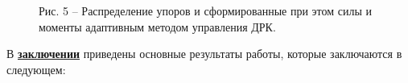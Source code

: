 \begin{figure}[ht]
    \caption*{Рис. 5 -- Распределение упоров и сформированные при этом силы и моменты адаптивным методом управления ДРК.}\label{fig:latex}
\end{figure}

\FloatBarrier
{}                                  %
В \underline{\textbf{заключении}} приведены основные результаты работы, которые заключаются в следующем:



